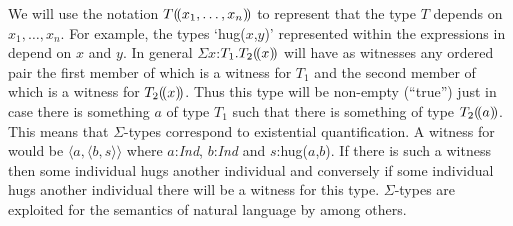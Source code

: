 We will use the notation $T(\!(x_1,\ldots,x_n)\!)$ to represent that the
type $T$ depends on $x_1,\ldots,x_n$.  For example, the types
`hug($x$,$y$)' represented within the expressions in \preveg{} depend
on $x$ and $y$.
In general $\Sigma
x$:$T_1.T_2(\!(x)\!)$ will have as witnesses any ordered pair the first
member of which is a witness for $T_1$ and the second member of which
is a witness for $T_2(\!(x)\!)$.  Thus this type will be non-empty
(``true'') just in case there is something $a$ of type $T_1$ such that
there is something of type $T_2(\!(a)\!)$.  This means that $\Sigma$-types
correspond to existential quantification.  A witness for  would be $\langle a,
\langle b, s\rangle\rangle$ where $a$:\textit{Ind}, $b$:\textit{Ind}
and $s$:hug($a$,$b$).  If there is such a witness then some individual
hugs another individual and conversely if some individual hugs another
individual there will be a witness for this type.  $\Sigma$-types are
exploited for the semantics of natural language by \cite{Ranta1994}
among others.

